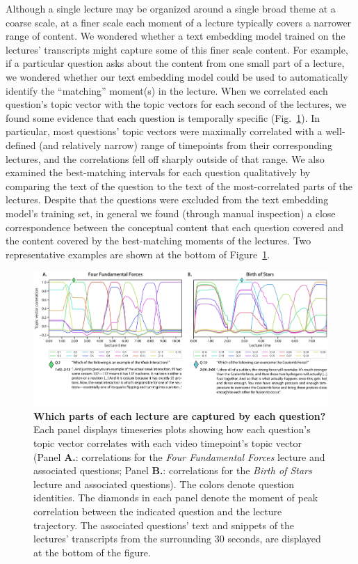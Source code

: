 \documentclass[10pt]{article}
\begin{document}
Although a single lecture may be organized around a single broad theme at a
coarse scale, at a finer scale each moment of a lecture typically covers a
narrower range of content. We wondered whether a text embedding model trained
on the lectures' transcripts might capture some of this finer scale content.
For example, if a particular question asks about the content from one small
part of a lecture, we wondered whether our text embedding model could be used
to automatically identify the ``matching'' moment(s) in the lecture. When we
correlated each question's topic vector with the topic vectors for each second
of the lectures, we found some evidence that each question is temporally
specific (Fig.~\ref{fig:question-correlations}). In particular, most questions'
topic vectors were maximally correlated with a well-defined (and relatively
narrow) range of timepoints from their corresponding lectures, and the
correlations fell off sharply outside of that range. We also examined the
best-matching intervals for each question qualitatively by comparing the text
of the question to the text of the most-correlated parts of the lectures.
Despite that the questions were excluded from the text embedding model's
training set, in general we found (through manual inspection) a close
correspondence between the conceptual content that each question covered and
the content covered by the best-matching moments of the lectures. Two
representative examples are shown at the bottom of
Figure~\ref{fig:question-correlations}.

\begin{figure}[tp] \centering
\includegraphics[width=\textwidth]{figs/lecture-question-similarity}

\caption{\textbf{Which parts of each lecture are captured by each question?}
Each panel displays timeseries plots showing how each question's topic vector
correlates with each video timepoint's topic vector (Panel \textbf{A.}:
correlations for the \textit{Four Fundamental Forces} lecture and associated
questions; Panel \textbf{B.}: correlations for the \textit{Birth of Stars}
lecture and associated questions). The colors denote question identities. The
diamonds in each panel denote the moment of peak correlation between the
indicated question and the lecture trajectory. The associated questions' text
and snippets of the lectures' transcripts from the surrounding 30 seconds, are
displayed at the bottom of the figure.}

    \label{fig:question-correlations}
\end{figure}
\end{document}
